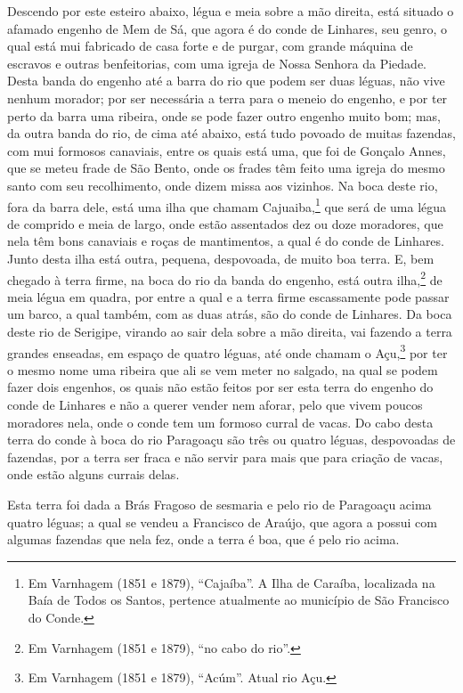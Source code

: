 \begin{linenumbers}
Descendo por este esteiro abaixo, légua e meia sobre a mão direita, está situado o afamado
engenho de Mem de Sá, que agora é do conde de Linhares, seu genro, o qual está mui
fabricado de casa forte e de purgar, com grande máquina de escravos e outras benfeitorias,
com uma igreja de Nossa Senhora da Piedade. Desta banda do engenho até a barra do rio que
podem ser duas léguas, não vive nenhum morador; por ser necessária a terra para o meneio
do engenho, e por ter perto da barra uma ribeira, onde se pode fazer outro engenho muito
bom; mas, da outra banda do rio, de cima até abaixo, está tudo povoado de muitas fazendas,
com mui formosos canaviais, entre os quais está uma, que foi
de Gonçalo Annes, que se meteu frade de São Bento, onde
os frades têm feito uma igreja do mesmo santo com seu recolhimento, onde dizem missa aos
vizinhos. Na boca deste rio, fora da barra dele, está uma ilha que chamam
Cajuaiba,\footnote{ Em Varnhagem (1851 e 1879), ``Cajaíba''. A Ilha de Caraíba, localizada
na Baía de Todos os Santos, pertence atualmente ao município de São Francisco do Conde.}
que será de uma légua de comprido e meia de largo, onde estão assentados dez ou doze
moradores, que nela têm bons canaviais e roças de mantimentos, a qual é do conde de
Linhares. Junto desta ilha está outra, pequena, despovoada, de muito boa terra. E, bem
chegado à terra firme, na boca do rio da banda do engenho, está outra ilha,\footnote{ Em
Varnhagem (1851 e 1879), ``no cabo do rio''.} de meia légua em quadra, por entre a qual e
a terra firme escassamente pode passar um barco, a qual também, com as duas atrás, são do
conde de Linhares. Da boca deste rio de Serigipe, virando ao sair dela sobre a mão
direita, vai fazendo a terra grandes enseadas, em espaço de quatro léguas, até onde chamam
o Açu,\footnote{ Em Varnhagem (1851 e 1879), ``Acúm''. Atual rio Açu.} por ter o mesmo
nome uma ribeira que ali se vem meter no salgado, na qual se podem fazer dois engenhos, os
quais não estão feitos por ser esta terra do engenho do conde de Linhares e não a querer
vender nem aforar, pelo que vivem poucos moradores nela, onde o
conde tem um formoso curral de vacas. Do cabo desta terra do conde à boca do rio Paragoaçu
são três ou quatro léguas, despovoadas de fazendas, por a terra ser fraca e não servir
para mais que para criação de vacas, onde estão alguns currais delas.

Esta terra foi dada a Brás Fragoso de sesmaria e pelo rio de Paragoaçu acima quatro
léguas; a qual se vendeu a Francisco de Araújo, que agora a possui com algumas fazendas
que nela fez, onde a terra é boa, que é pelo rio acima.


\end{linenumbers}
